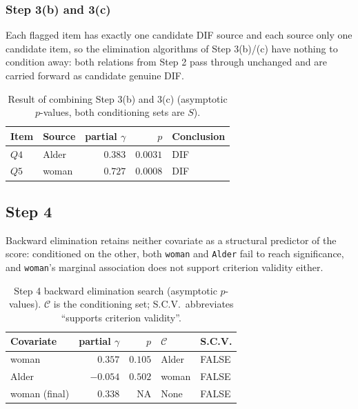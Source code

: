 \subsubsection{Step 3(b) and 3(c)}
Each flagged item has exactly one candidate DIF source and each source only one candidate item, so the elimination algorithms of Step 3(b)/(c) have nothing to condition away: both relations from Step 2 pass through unchanged and are carried forward as candidate genuine DIF.
\begin{table}[H]
\centering
\begin{tabular}{@{}llrrl@{}}
\toprule
Item & Source & partial $\gamma$ & $p$ & Conclusion \\
\midrule
$Q4$ & Alder & $0.383$ & $0.0031$ & DIF \\
$Q5$ & woman & $0.727$ & $0.0008$ & DIF \\
\bottomrule
\end{tabular}
\caption{Result of combining Step 3(b) and 3(c) (asymptotic $p$-values, both conditioning sets are $S$).}
\label{tab:ak_step3bc}
\end{table}

\subsection{Step 4}
Backward elimination retains neither covariate as a structural predictor of the score: conditioned on the other, both \texttt{woman} and \texttt{Alder} fail to reach significance, and \texttt{woman}'s marginal association does not support criterion validity either.
\begin{table}[H]
\centering
\begin{tabular}{@{}lrrll@{}}
\toprule
Covariate & partial $\gamma$ & $p$ & $\mathcal{C}$ & S.C.V. \\
\midrule
woman & $0.357$ & $0.105$ & Alder & FALSE \\
Alder & $-0.054$ & $0.502$ & woman & FALSE \\
\midrule
woman (final) & $0.338$ & NA & None & FALSE \\
\bottomrule
\end{tabular}
\caption{Step 4 backward elimination search (asymptotic $p$-values). $\mathcal{C}$ is the conditioning set; S.C.V.\ abbreviates ``supports criterion validity''.}
\label{tab:ak_step4}
\end{table}


